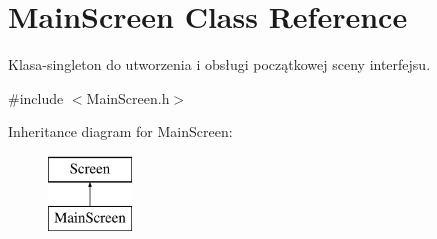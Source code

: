 \hypertarget{class_main_screen}{}\section{Main\+Screen Class Reference}
\label{class_main_screen}


Klasa-\/singleton do utworzenia i obsługi początkowej sceny interfejsu.  




{\ttfamily \#include $<$Main\+Screen.\+h$>$}

Inheritance diagram for Main\+Screen\+:\begin{figure}[H]
\begin{center}
\leavevmode
\includegraphics[height=2.000000cm]{class_main_screen}
\end{center}
\end{figure}

